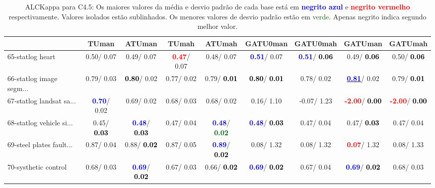 \begin{table}[h]
\caption{ALCKappa para C4.5: Os maiores valores da média e desvio padrão de cada base está em \textcolor{blue}{\textbf{negrito azul}} e \textcolor{red}{\textbf{negrito vermelho}} respectivamente. Valores isolados estão sublinhados. Os menores valores de desvio padrão estão em \textcolor{darkgreen}{verde}. Apenas negrito indica segundo melhor valor.}
\begin{center}\begin{tabular}{lc|c|c|c|c|c|c|c}
 & TUman & \textbf{ATUman} & TUmah & \textbf{ATUmah} & GATU0man & GATU0mah & GATUman & GATUmah\\ \hline 65-statlog heart &   0.50/  0.07 &   0.49/  0.07 & \textcolor{red}{\textbf{  0.47}}/  0.07 &   0.48/  0.07 & \textcolor{blue}{\textbf{  0.51}}/  0.07 & \textcolor{blue}{\textbf{  0.51}}/\textcolor{black}{\textbf{  0.06}} &   0.49/\textcolor{black}{\textbf{  0.06}} &   0.50/\textcolor{black}{\textbf{  0.06}} \\
66-statlog image segm... &   0.79/  0.03 & \textcolor{black}{\textbf{  0.80}}/  0.02 &   0.77/  0.02 &   0.79/\textcolor{black}{\textbf{  0.01}} & \textcolor{black}{\textbf{  0.80}}/\textcolor{black}{\textbf{  0.01}} &   0.78/  0.02 & \underline{\textcolor{blue}{\textbf{  0.81}}}/  0.02 &   0.79/\textcolor{black}{\textbf{  0.01}} \\
67-statlog landsat sa... & \textcolor{blue}{\textbf{  0.70}}/  0.02 &   0.69/  0.02 &   0.68/  0.03 &   0.68/  0.02 &   0.16/  1.10 &  -0.07/  1.23 & \textcolor{red}{\textbf{ -2.00}}/\textcolor{black}{\textbf{  0.00}} & \textcolor{red}{\textbf{ -2.00}}/\textcolor{black}{\textbf{  0.00}} \\
68-statlog vehicle si... &   0.45/\textcolor{black}{\textbf{  0.03}} & \textcolor{blue}{\textbf{  0.48}}/\textcolor{black}{\textbf{  0.03}} &   0.47/  0.04 & \textcolor{blue}{\textbf{  0.48}}/\textcolor{darkgreen}{\textbf{  0.02}} & \textcolor{blue}{\textbf{  0.48}}/\textcolor{black}{\textbf{  0.03}} &   0.47/  0.04 &   0.47/\textcolor{black}{\textbf{  0.03}} &   0.47/  0.04 \\
69-steel plates fault... &   0.87/  0.04 &   0.88/\textcolor{black}{\textbf{  0.02}} &   0.87/  0.05 & \textcolor{blue}{\textbf{  0.89}}/\textcolor{black}{\textbf{  0.02}} &   0.08/  1.32 &   0.08/  1.32 & \textcolor{red}{\textbf{  0.07}}/  1.32 &   0.08/  1.33 \\
70-systhetic control &   0.68/  0.03 & \textcolor{blue}{\textbf{  0.69}}/\textcolor{black}{\textbf{  0.02}} &   0.67/  0.03 &   0.66/\textcolor{black}{\textbf{  0.02}} & \textcolor{blue}{\textbf{  0.69}}/\textcolor{black}{\textbf{  0.02}} &   0.67/  0.04 & \textcolor{blue}{\textbf{  0.69}}/\textcolor{black}{\textbf{  0.02}} &   0.68/  0.03 \\

\end{tabular}
\end{center}
\end{table}
